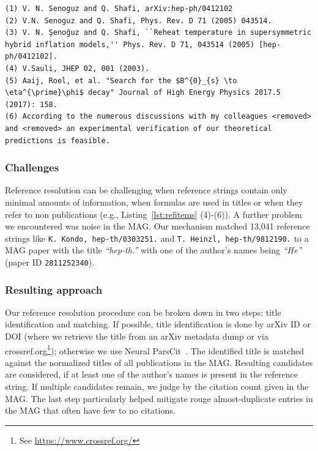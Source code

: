 \begin{lstlisting}[caption={Examples of reference strings.},label={lst:refitems}]
(1) V. N. Senoguz and Q. Shafi, arXiv:hep-ph/0412102
(2) V.N. Senoguz and Q. Shafi, Phys. Rev. D 71 (2005) 043514.
(3) V. N. Şenoğuz and Q. Shafi, ``Reheat temperature in supersymmetric hybrid inflation models,'' Phys. Rev. D 71, 043514 (2005) [hep-ph/0412102].
(4) V.Sauli, JHEP 02, 001 (2003).
(5) Aaij, Roel, et al. "Search for the $B^{0}_{s} \to \eta^{\prime}\phi$ decay" Journal of High Energy Physics 2017.5 (2017): 158.
(6) According to the numerous discussions with my colleagues <removed> and <removed> an experimental verification of our theoretical predictions is feasible.
\end{lstlisting} %

\subsubsection{Challenges}
Reference resolution can be challenging when reference strings contain only minimal amounts of information, when formulas are used in titles or when they refer to non publications (e.g., Listing~\ref{lst:refitems} (4)-(6)). A further problem we encountered was noise in the MAG. Our mechanism matched 13,041 reference strings like \texttt{K. Kondo, hep-th/0303251.} and \texttt{T. Heinzl, hep-th/9812190.} to a MAG paper with the title \textit{``hep-th.''} with one of the author's names being \textit{``He''} (paper ID \texttt{2811252340}).

\subsubsection{Resulting approach}
Our reference resolution procedure can be broken down in two steps: title identification and matching. If possible, title identification is done by arXiv ID or DOI (where we retrieve the title from an arXiv metadata dump or via crossref.org\footnote{See \url{https://www.crossref.org/}}); otherwise we use Neural ParsCit~\cite{Animesh2018}. The identified title is matched against the normalized titles of all publications in the MAG. Resulting candidates are considered, if at least one of the author's names is present in the reference string. If multiple candidates remain, we judge by the citation count given in the MAG. The last step particularly helped mitigate rouge almost-duplicate entries in the MAG that often have few to no citations.

